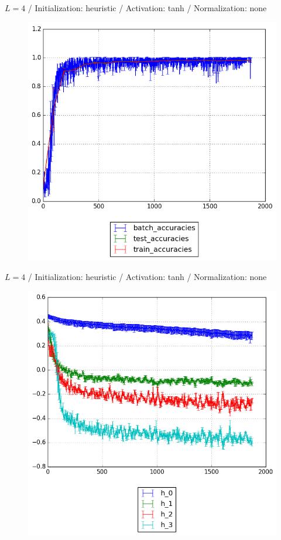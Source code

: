 \documentclass{beamer}
\begin{document}
{	%
	\begin{frame}[t]{}{}%
		\vfill
		\begin{center}
			{$L = 4$ / Initialization: heuristic / Activation: tanh / Normalization: none}
		\end{center}
    		\begin{figure}
    			\centering
    			\includegraphics[scale=0.4]{gfx/l4b32_tanh_heuristic_identity_cnn_accuracies}
    		\end{figure}
    		\vfill
	\end{frame}
	\begin{frame}[t]{}{}%
		\vfill
		\begin{center}
			{$L = 4$ / Initialization: heuristic / Activation: tanh / Normalization: none}
		\end{center}
    		\begin{figure}
    			\centering
    			\includegraphics[scale=0.4]{gfx/l4b32_tanh_heuristic_identity_cnn_activations}

\end{figure}
\end{frame}}
\end{document}
